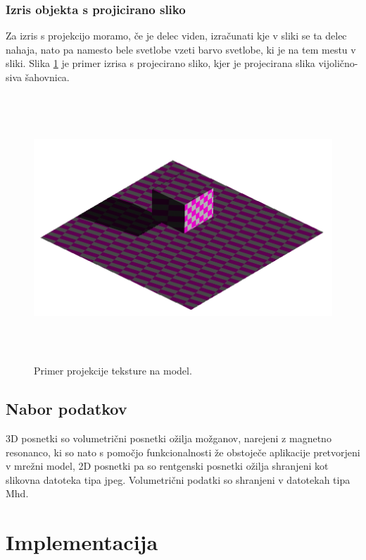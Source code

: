 \documentclass[a4paper, 12pt]{book}
\begin{document}
\subsection*{Izris objekta s projicirano sliko}
Za izris s projekcijo moramo, če je delec viden, izračunati kje v sliki se ta delec nahaja, nato pa namesto bele svetlobe vzeti barvo svetlobe, ki je na tem mestu v sliki. Slika \ref{teksturaprojecirananamodel} je primer izrisa s projecirano sliko, kjer je projecirana slika vijolično-siva šahovnica.

\begin{figure}[h]
\begin{center}
\includegraphics[width=12cm, height=10cm, keepaspectratio=true]{Tekstura_projecirana_na_model.png}
\end{center}
\caption{Primer projekcije teksture na model.}
\label{teksturaprojecirananamodel}
\end{figure}

\section{Nabor podatkov}
3D posnetki so volumetrični posnetki ožilja možganov, narejeni z magnetno resonanco, ki so nato s pomočjo funkcionalnosti že obstoječe aplikacije pretvorjeni v mrežni model, 2D posnetki pa so rentgenski posnetki ožilja shranjeni kot slikovna datoteka tipa jpeg\cite{jpeg}. Volumetrični podatki so shranjeni v datotekah tipa Mhd\cite{mhd}.

\chapter{Implementacija}
\end{document}
